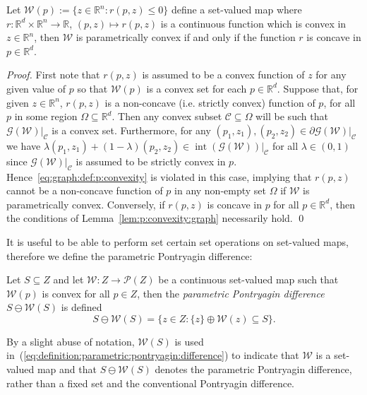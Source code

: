 \documentclass[smallextended]{svjour3}       %
\numberwithin{equation}{section}
\DeclareMathOperator{\interior}{int}
\begin{document}
%
\begin{theorem}\label{thm:inequalities:convex:concave}
%
Let $\mathcal W(p):=\{z\in\mathbb R^n: r(p,z)\leq0\}$ define a set-valued
map where 
$r: \mathbb R^d \times\mathbb R^n \rightarrow \mathbb R$, $(p,z)\mapsto r(p,z)$ is a continuous function which is convex in $z \in\mathbb R^n$, 
then $\mathcal W$ is parametrically
convex if and only if the function $r$ is concave in $p\in\mathbb R^d$.
%
\end{theorem}
%
\begin{proof}
First note that $r(p,z)$ is assumed to be a convex function of $z$ for any given value of $p$ so that $\mathcal W(p)$ is a convex set for each $p\in\mathbb R^d$.
%
Suppose that, for given $z\in\mathbb R^n$, $r(p,z)$ is a non-concave (i.e. 
strictly convex) function of $p$, for all $p$ in some region $\Omega\subseteq\mathbb R^d$. 
%
Then any convex subset $\mathcal C\subseteq\Omega$ will be such that $\mathscr 
G(\mathcal W)\vert_{\mathcal C}$ is a convex set.
%
Furthermore, for any $(p_1,z_1),(p_2,z_2)\in \partial\mathscr G(\mathcal W)\vert_{\mathcal C}$ we have
$\lambda (p_1,z_1) + (1-\lambda) (p_2,z_2) \in\interior (\mathscr G(\mathcal W))\vert_{\mathcal C}$ for all $\lambda\in(0,1)$ since
$\mathscr G(\mathcal W)\vert_{\mathcal C}$ is assumed to be strictly convex in $p$.
%
Hence~\eqref{eq:graph:def:p:convexity} is violated in this case, implying that $r(p,z)$ cannot be a non-concave function of $p$ in any non-empty set $\Omega$ if $\mathcal W$ is parametrically convex. 
%
Conversely, if $r(p,z)$ is concave in $p$ for all $p\in\mathbb R^d$, then the conditions of Lemma~\ref{lem:p:convexity:graph} necessarily hold.
\qed
\end{proof}
%
It is useful to be able to perform set certain set operations on set-valued maps, therefore we define the parametric Pontryagin difference:
%
\begin{definition}\label{def:parametric:pontryagin:difference}
  Let $S\subseteq Z$ and let $\mathcal W:Z\to\mathscr P(Z)$ be a continuous set-valued map such that
  $\mathcal W(p)$ is convex for all $p\in Z$, then the \emph{parametric Pontryagin difference} 
  $S\ominus \mathcal W(S)$ is defined
%
\begin{equation}\label{eq:definition:parametric:pontryagin:difference}
    S\ominus \mathcal W(S) = \bigl\{z\in Z: \{z\} \oplus \mathcal W(z)\subseteq S\bigr\}.
  \end{equation}
%
\end{definition}
%
By a slight abuse of notation, $\mathcal{W}(S)$ is used in~(\ref{eq:definition:parametric:pontryagin:difference}) to indicate that $\mathcal{W}$ is a set-valued map and that $S\ominus\mathcal{W}(S)$ denotes the parametric Pontryagin difference, rather than a fixed set and the conventional Pontryagin difference. 
\end{document}

